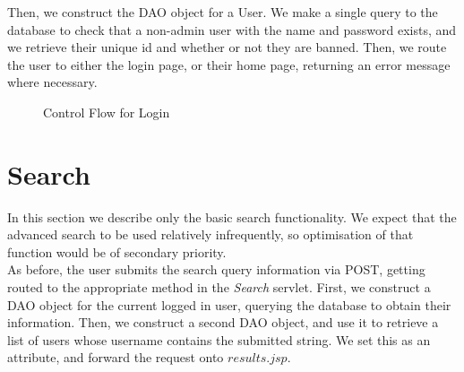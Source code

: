 \documentclass[11pt]{report}
\begin{document}
Then, we construct the DAO object for a User. We make a single query to the database to check that a non-admin user with the name and password exists, and we retrieve their unique id and whether or not they are banned. Then, we route the user to either the login page, or their home page, returning an error message where necessary. 
\begin{figure}[!htb]
\caption{Control Flow for Login}
\end{figure}

\section{Search}
In this section we describe only the basic search functionality. We expect that the advanced search to be used relatively infrequently, so optimisation of that function would be of secondary priority. \\

As before, the user submits the search query information via POST, getting routed to the appropriate method in the \emph{Search} servlet. First, we construct a DAO object for the current logged in user, querying the database to obtain their information. Then, we construct a second DAO object, and use it to retrieve a list of users whose username contains the submitted string. We set this as an attribute, and forward the request onto $results.jsp$. 
\end{document}
